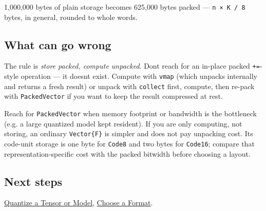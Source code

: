 1,000,000 bytes of plain storage becomes 625,000 bytes packed — \texttt{n × K / 8} bytes, in general, rounded to whole words.



\subsection{What can go wrong}



\label{7385351218440078181-dup4}{}


\begin{tcolorbox}[toptitle=-1mm,bottomtitle=1mm,colback=admonition-warning!50!white,colframe=admonition-warning,title=\textbf{There is deliberately no in-place packed arithmetic}]
The rule is \emph{store packed, compute unpacked}. Don{\textquotesingle}t reach for an in-place packed \texttt{+=}-style operation — it doesn{\textquotesingle}t exist. Compute with \texttt{vmap} (which unpacks internally and returns a fresh result) or unpack with \texttt{collect} first, compute, then re-pack with \texttt{PackedVector} if you want to keep the result compressed at rest.

\end{tcolorbox}


\begin{tcolorbox}[toptitle=-1mm,bottomtitle=1mm,colback=admonition-default!50!white,colframe=admonition-default,title=\textbf{Packing helps storage bandwidth, not per-element compute speed}]
Reach for \texttt{PackedVector} when memory footprint or bandwidth is the bottleneck (e.g. a large quantized model kept resident). If you are only computing, not storing, an ordinary \texttt{Vector\{F\}} is simpler and does not pay unpacking cost. Its code-unit storage is one byte for \texttt{Code8} and two bytes for \texttt{Code16}; compare that representation-specific cost with the packed bitwidth before choosing a layout.

\end{tcolorbox}


\subsection{Next steps}



\label{3807517405601295309-dup4}{}


\href{workflow\_\allowbreak{}quantize\_\allowbreak{}measure.md}{Quantize a Tensor or Model}, \href{workflow\_\allowbreak{}choose\_\allowbreak{}format.md}{Choose a Format}.



